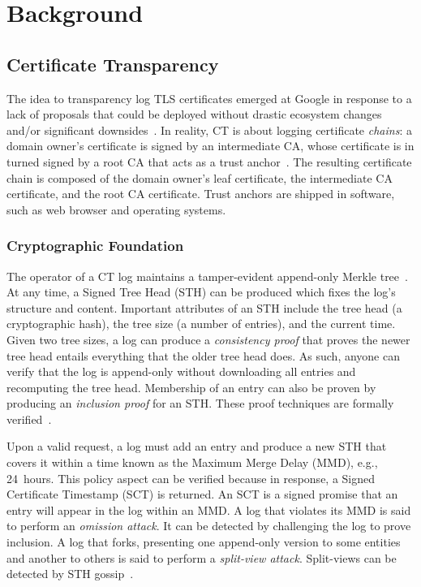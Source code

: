\section{Background} \label{sec:background}

\subsection{Certificate Transparency} \label{sec:background:ct}
The idea to transparency log TLS certificates emerged at Google in response to
a lack of proposals that could be deployed without drastic ecosystem changes
and/or significant downsides~\cite{ct/a}.  In reality, CT is about logging
certificate \emph{chains}:
	a domain owner's certificate is signed by an intermediate CA, whose
	certificate is in turned signed by a root CA that acts as a trust
	anchor~\cite{ca-ecosystem}.
The resulting certificate chain is composed of the domain owner's leaf
certificate, the intermediate CA certificate, and the root CA certificate.
Trust anchors are shipped in software, such as web browser and operating
systems.

\subsubsection{Cryptographic Foundation}
The operator of a CT log maintains a tamper-evident append-only Merkle
tree~\cite{ct,ct/bis}.  At any time, a Signed Tree Head (STH) can be produced
which fixes the log's structure and content.  Important attributes of an STH
include
	the tree head (a cryptographic hash),
	the tree size (a number of entries), and
	the current time.
Given two tree sizes, a log can produce a \emph{consistency proof} that proves
the newer tree head entails everything that the older tree head does.  As such,
anyone can verify that the log is append-only without downloading all entries
and recomputing the tree head.  Membership of an entry can also be proven
by producing an \emph{inclusion proof} for an STH.  These proof techniques are
formally verified~\cite{secure-logging-and-ct}.

Upon a valid request, a log must add an entry and produce a new STH that covers
it within a time known as the Maximum Merge Delay (MMD), e.g., 24~hours.  This
policy aspect can be verified because in response, a Signed Certificate
Timestamp (SCT) is returned.  An SCT is a signed promise that an entry will
appear in the log within an MMD.  A log that violates its MMD is said to perform
an \emph{omission attack}.  It can be detected by challenging the log to prove
inclusion.  A log that forks, presenting one append-only version
to some entities and another to others is said to perform a \emph{split-view
attack}.  Split-views can be detected by STH
gossip~\cite{chuat,dahlberg,nordberg,syta}.

